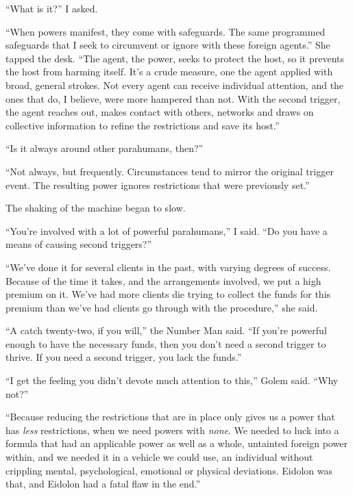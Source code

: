 ``What is it?''  I asked.



``When powers manifest, they come with safeguards.  The same programmed safeguards that I seek to circumvent or ignore with these foreign agents.''  She tapped the desk.  ``The agent, the power, seeks to protect the host, so it prevents the host from harming itself.  It's a crude measure, one the agent applied with broad, general strokes.  Not every agent can receive individual attention, and the ones that do, I believe, were more hampered than not.  With the second trigger, the agent reaches out, makes contact with others, networks and draws on collective information to refine the restrictions and save its host.''



``Is it always around other parahumans, then?''



``Not always, but frequently.  Circumstances tend to mirror the original trigger event.  The resulting power ignores restrictions that were previously set.''



The shaking of the machine began to slow.



``You're involved with a lot of powerful parahumans,'' I said.  ``Do you have a means of causing second triggers?''



``We've done it for several clients in the past, with varying degrees of success.  Because of the time it takes, and the arrangements involved, we put a high premium on it.  We've had more clients die trying to collect the funds for this premium than we've had clients go through with the procedure,'' she said.



``A catch twenty-two, if you will,'' the Number Man said.  ``If you're powerful enough to have the necessary funds, then you don't need a second trigger to thrive.  If you need a second trigger, you lack the funds.''



``I get the feeling you didn't devote much attention to this,'' Golem said.  ``Why not?''



``Because reducing the restrictions that are in place only gives us a power that has \emph{less} restrictions, when we need powers with \emph{none}.  We needed to luck into a formula that had an applicable power as well as a whole, untainted foreign power within, and we needed it in a vehicle we could use, an individual without crippling mental, psychological, emotional or physical deviations.  Eidolon was that, and Eidolon had a fatal flaw in the end.''



